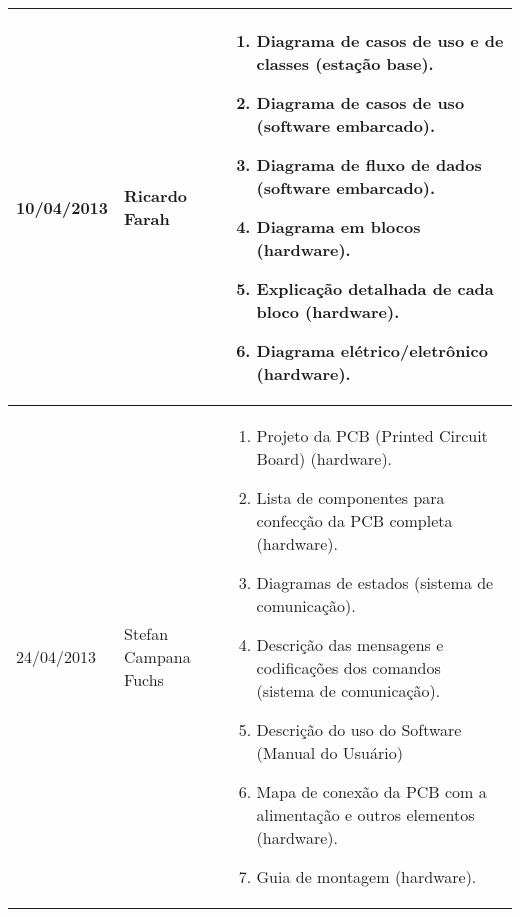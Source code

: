 \begin{table}[h]
  \centering
  \begin{tabular}{p{3cm}|p{4cm}||p{7cm}}
    10/04/2013 & Ricardo Farah & 
    \begin{enumerate}[topsep=0pt, partopsep=0pt, itemsep=0pt]
      \item Diagrama de casos de uso e de classes (estação base).
      \item Diagrama de casos de uso (software embarcado).
      \item Diagrama de fluxo de dados (software embarcado).
      \item Diagrama em blocos (hardware).
      \item Explicação detalhada de cada bloco (hardware).
      \item Diagrama elétrico/eletrônico (hardware).
    \end{enumerate}\\
    \hline
    24/04/2013 & Stefan Campana Fuchs & 
    \begin{enumerate}[topsep=0pt, partopsep=0pt, itemsep=0pt]
      \item Projeto da PCB (Printed Circuit Board) (hardware).
      \item Lista de componentes para confecção da PCB completa (hardware).
      \item Diagramas de estados (sistema de comunicação).
      \item Descrição das mensagens e codificações dos comandos (sistema de comunicação).
      \item Descrição do uso do Software (Manual do Usuário)
      \item Mapa de conexão da PCB com a alimentação e outros elementos (hardware).
      \item Guia de montagem (hardware).
    \end{enumerate}\\
    \bottomrule
  \end{tabular}%
  \label{tab:deliverables2}%
\end{table}%
